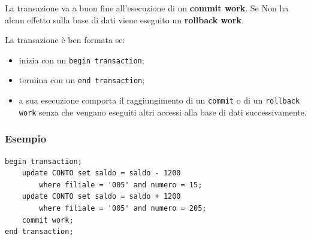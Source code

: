\documentclass[oneside,a4paper,11pt]{book}
\theoremstyle{italicstyle}
\theoremstyle{normStyle}
\begin{document}
La transazione va a buon fine all'esecuzione di un \textbf{commit work}. Se 
Non ha alcun effetto sulla base di dati viene eseguito un \textbf{rollback work}.

La transazione è ben formata se:
\begin{itemize}
    \item inizia con un \verb|begin transaction|;
    \item termina con un \verb|end transaction|;
    \item a sua esecuzione comporta il raggiungimento 
di un \verb|commit| o di un \verb|rollback work| senza che vengano eseguiti 
altri accessi alla base di dati successivamente. 
\end{itemize}
\subsubsection{Esempio}
\begin{lstlisting}
begin transaction;
    update CONTO set saldo = saldo - 1200
        where filiale = '005' and numero = 15;
    update CONTO set saldo = saldo + 1200
        where filiale = '005' and numero = 205;
    commit work;
end transaction;
\end{lstlisting}
\end{document}
